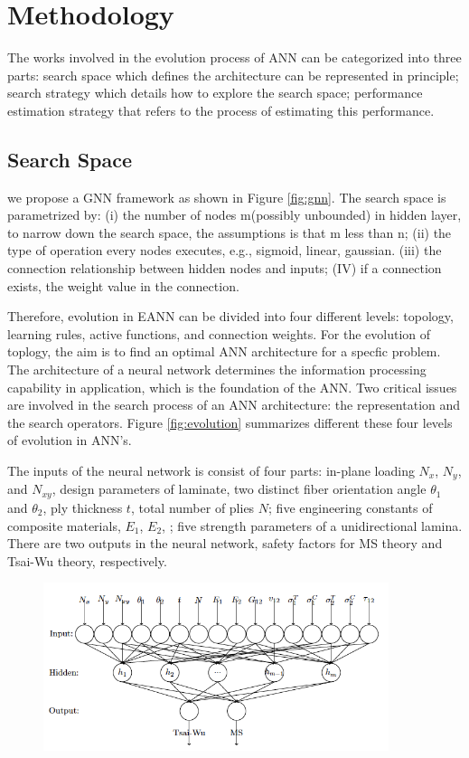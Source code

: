 \section{Methodology}
The works involved in the evolution process of ANN can be categorized into
three parts:  search space which defines the architecture can be represented in
principle; search strategy which details how to explore the search space;
performance estimation strategy that refers to the process of estimating this
performance.


\subsection{Search Space}

we propose a GNN framework as shown in Figure \ref{fig:gnn}. The search space
is parametrized by: (i) the number of nodes m(possibly unbounded) in hidden
layer, to narrow down the search space, the assumptions is that m less than n; (ii) the type of
operation every nodes executes, e.g., sigmoid, linear, gaussian. (iii) the
connection relationship between hidden nodes and inputs; (IV) if a connection
exists, the weight value in the connection.

Therefore, evolution in EANN can be divided into four different levels: topology, learning
rules, active functions, and connection weights. For the evolution of toplogy,
the aim is to find an optimal ANN architecture for a specfic problem. The
architecture of a neural network determines the information processing
capability in application, which is the foundation of the ANN. Two critical
issues are involved in the search process of an ANN architecture: the
representation and the search operators.
Figure \ref{fig:evolution} summarizes different these four levels of evolution in ANN's.

The inputs of the neural network is consist of four parts: in-plane loading
$N_x$, $N_y$, and $N_{xy}$, design parameters of laminate, two distinct fiber
orientation angle $\theta_1$ and $\theta_2$, ply thickness $t$, total number of
plies $N$; five engineering constants of composite materials, $E_1$, $E_2$, ;
five strength parameters of a unidirectional lamina. There are two outputs in
the neural network, safety factors for MS theory and Tsai-Wu theory, respectively.
\begin{figure}
	\centering
	\includegraphics[width=0.9\textwidth]{fig/ann_for_clt_architecture.png}
\end{figure}

